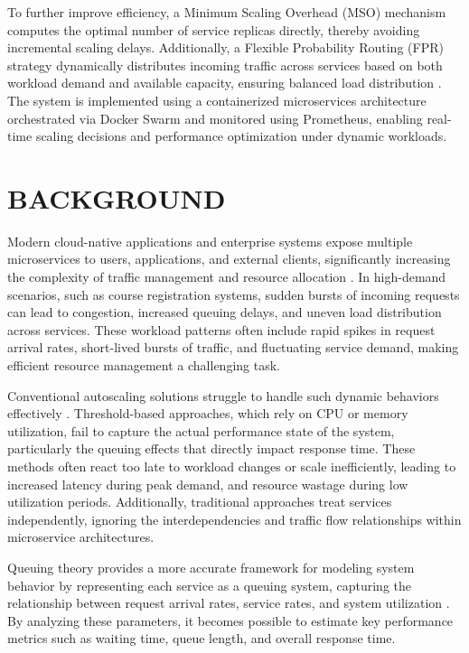 To further improve efficiency, a Minimum Scaling Overhead (MSO) mechanism computes the optimal number of service replicas directly, thereby avoiding incremental scaling delays. Additionally, a Flexible Probability Routing (FPR) strategy dynamically distributes incoming traffic across services based on both workload demand and available capacity, ensuring balanced load distribution \cite{arulmary2026}. The system is implemented using a containerized microservices architecture orchestrated via Docker Swarm and monitored using Prometheus, enabling real-time scaling decisions and performance optimization under dynamic workloads.

\section{BACKGROUND}

Modern cloud-native applications and enterprise systems expose multiple microservices to users, applications, and external clients, significantly increasing the complexity of traffic management and resource allocation \cite{fourati2021}. In high-demand scenarios, such as course registration systems, sudden bursts of incoming requests can lead to congestion, increased queuing delays, and uneven load distribution across services. These workload patterns often include rapid spikes in request arrival rates, short-lived bursts of traffic, and fluctuating service demand, making efficient resource management a challenging task.

Conventional autoscaling solutions struggle to handle such dynamic behaviors effectively \cite{khaleq2021}. Threshold-based approaches, which rely on CPU or memory utilization, fail to capture the actual performance state of the system, particularly the queuing effects that directly impact response time. These methods often react too late to workload changes or scale inefficiently, leading to increased latency during peak demand, and resource wastage during low utilization periods. Additionally, traditional approaches treat services independently, ignoring the interdependencies and traffic flow relationships within microservice architectures.

Queuing theory provides a more accurate framework for modeling system behavior by representing each service as a queuing system, capturing the relationship between request arrival rates, service rates, and system utilization \cite{lai2025}. By analyzing these parameters, it becomes possible to estimate key performance metrics such as waiting time, queue length, and overall response time.

